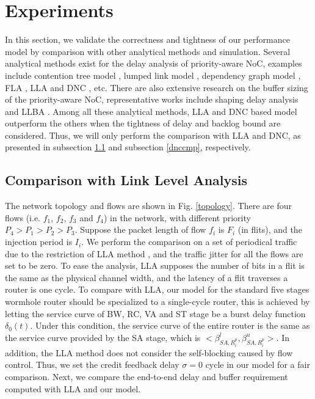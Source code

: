 \documentclass[10pt,journal]{IEEEtran}
\begin{document}
\section{Experiments}\label{experiments}
In this section, we validate the correctness and tightness of our performance model by comparison with other analytical methods and simulation. Several analytical methods exist for the delay analysis of priority-aware NoC, examples include contention tree model \cite{LuJS05}, lumped link model \cite{707545}, dependency graph model \cite{708526}, FLA \cite{Shi:2008:RCA:1397757.1397996}, LLA \cite{73} and DNC \cite{Qian489900}, etc. There are also extensive research on the buffer sizing of the priority-aware NoC, representative works include shaping delay analysis \cite{Manolache:2006:BSO:1131481.1131683} and LLBA \cite{189}. Among all these analytical methods, LLA \cite{73}\cite{189} and DNC \cite{Qian489900} based model outperform the others when the tightness of delay and backlog bound are considered. Thus, we will only perform the comparison with LLA and DNC, as presented in subsection \ref{llacmp} and subsection \ref{dnccmp}, respectively.

\subsection{Comparison with Link Level Analysis}\label{llacmp}
The network topology and flows are shown in Fig. \ref{topology}. There are four flows (i.e. $f_1$, $f_2$, $f_3$ and $f_4$) in the network, with different priority $P_4>P_1>P_2>P_3$. Suppose the packet length of flow $f_i$ is $F_i$ (in flits), and the injection period is $I_i$. We perform the comparison on a set of periodical traffic due to the restriction of LLA method \cite{73}\cite{189}, and the traffic jitter for all the flows are set to be zero. To ease the analysis, LLA supposes the number of bits in a flit is the same as the physical channel width, and the latency of a flit traverses a router is one cycle. To compare with LLA, our model for the standard five stages wormhole router should be specialized to a single-cycle router, this is achieved by letting the service curve of BW, RC, VA and ST stage be a burst delay function $\delta_0(t)$. Under this condition, the service curve of the entire router is the same as the service curve provided by the SA stage, which is $<\beta_{SA,R_i^p}^l,\beta_{SA,R_i^p}^u>$. In addition, the LLA method does not consider the self-blocking caused by flow control. Thus, we set the credit feedback delay $\sigma=0$ cycle in our model for a fair comparison. Next, we compare the end-to-end delay and buffer requirement computed with LLA and our model.
\end{document}
